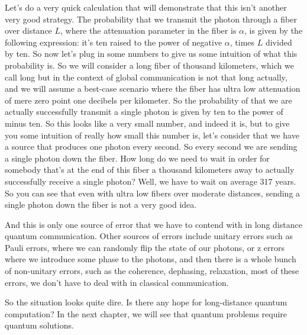 Let's do a very quick calculation that will demonstrate that this isn't another very good strategy. The probability that we transmit the photon through a fiber over distance $L$, where the attenuation parameter in the fiber is $\alpha$, is given by the following expression: it's ten raised to the power of negative $\alpha$, times $L$ divided by ten. So now let's plug in some numbers to give us some intuition of what this probability is. So we will consider a long fiber of thousand kilometers, which we call long but in the context of global communication is not that long actually, and we will assume a best-case scenario where the fiber has ultra low attenuation of mere zero point one decibels per kilometer. So the probability of that we are actually successfully transmit a single photon is given by ten to the power of minus ten. So this looks like a very small number, and indeed it is, but to give you some intuition of really how small this number is, let's consider that we have a source that produces one photon every second. So every second we are sending a single photon down the fiber. How long do we need to wait in order for somebody that's at the end of this fiber a thousand kilometers away to actually successfully receive a single photon? Well, we have to wait on average 317 years. So you can see that even with ultra low fibers over moderate distances, sending a single photon down the fiber is not a very good idea.

And this is only one source of error that we have to contend with in long distance quantum communication. Other sources of errors include unitary errors such as Pauli errors, where we can randomly flip the state of our photons, or z errors where we introduce some phase to the photons, and then there is a whole bunch of non-unitary errors, such as the coherence, dephasing, relaxation, most of these errors, we don't have to deal with in classical communication.

So the situation looks quite dire. Is there any hope for long-distance quantum computation? In the next chapter, we will see that quantum problems require quantum solutions.



\newpage
\begin{exercises}




\end{exercises}

